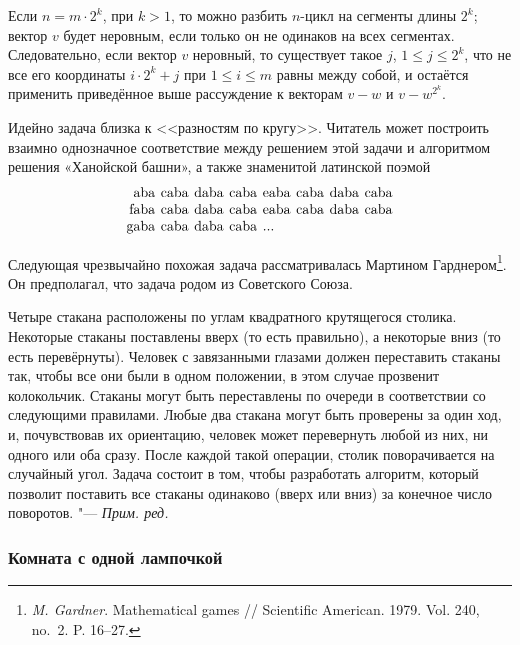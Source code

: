 \documentclass[twoside]{book}
\newenvironment{addedbytheeditors}{\par\medskip\small
}{\par\addvspace{\medskipamount}} %
\begin{document}
Если $n=m\cdot 2^k$, при $k>1$, то можно разбить $n$-цикл на сегменты длины $2^k$; вектор $v$ будет неровным, если только он не одинаков на всех сегментах.
Следовательно, если вектор $v$ неровный, то существует такое $j$, $1\le j\le 2^k$, что не все его координаты $i\cdot 2^k+j$ при $1\le i\le m$ равны между собой, и остаётся применить приведённое выше рассуждение к векторам $v-w$ и $v-w^{2^k}$. %

\begin{addedbytheeditors}
Идейно задача близка к <<разностям по кругу>>.
Читатель может построить взаимно однозначное соответствие между решением этой задачи и алгоритмом решения «Ханойской башни», а также знаменитой латинской поэмой
\[
\tabcolsep2pt
\begin{tabular}{rlllllll}
aba & caba & daba & caba & eaba & caba & daba & caba\\
faba & caba & daba & caba & eaba & caba & daba & caba\\
gaba & caba & daba & caba & ...
\end{tabular}
\]


Следующая чрезвычайно похожая задача рассматривалась Мартином Гарднером\footnote{\emph{M. Gardner}.
Mathematical games /\!/ Scientific American. 1979. Vol. 240, no.~2.
P. 16--27.}.
Он предполагал, что задача родом из Советского Союза. 

Четыре стакана расположены по углам квадратного крутящегося столика.
Некоторые стаканы поставлены вверх (то есть правильно), а некоторые вниз (то есть перевёрнуты). Человек с завязанными глазами должен переставить стаканы так, чтобы все они были в одном положении, в этом случае прозвенит колокольчик.
Стаканы могут быть переставлены по очереди в соответствии со следующими правилами.
Любые два стакана могут быть проверены за один ход, и, почувствовав их ориентацию, человек может перевернуть любой из них, ни одного или оба сразу.
После каждой такой операции, столик поворачивается на случайный угол.
Задача состоит в том, чтобы разработать алгоритм, который позволит 
поставить все стаканы одинаково (вверх или вниз) за конечное число поворотов.
"--- \emph{Прим. ред.}  
\end{addedbytheeditors}

\subsubsection*{Комната с одной лампочкой}%
\end{document}
